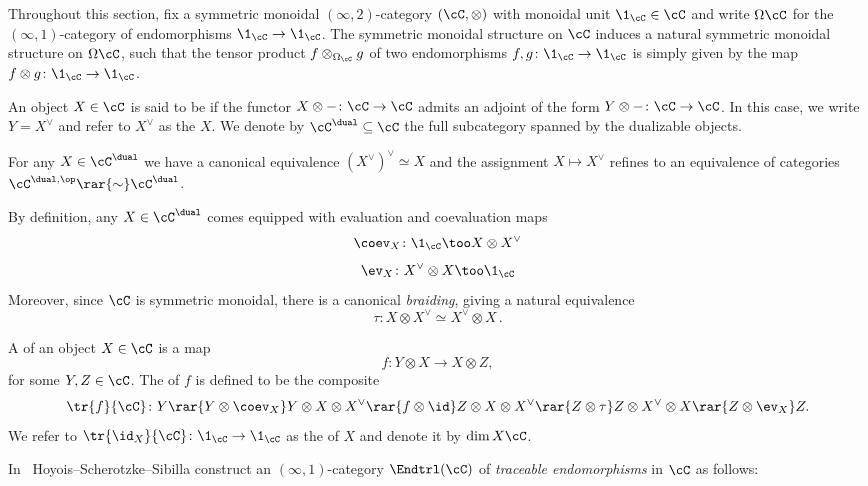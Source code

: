 Throughout this section, fix a symmetric monoidal $(\infty,2)$-category $(\cC,\otimes)$ with
monoidal unit $\1_{\cC} \in \cC$ and write $\Omega\cC$ for the $(\infty,1)$-category of
endomorphisms $\1_{\cC} \to \1_{\cC}$. The symmetric monoidal structure on $\cC$
induces a natural symmetric monoidal structure on $\Omega \cC$, such that
the tensor product $f\otimes_{\Omega_{\cC}} g$ of two endomorphisms
$f,g\colon \1_{\cC} \to \1_{\cC}$ is simply given by the map $f\otimes g\colon \1_{\cC} \to \1_{\cC}$. 

\begin{defn}
  An object $X\in \cC$ is said to be 
  if the functor $X\otimes - \colon \cC \to \cC$ admits an adjoint of the form
  $Y\otimes - \colon \cC \to \cC$. In this case, we write $Y= X^{\vee}$ and refer to $X^{\vee}$ as
  the  $X$. We denote by $\cC^{\dual}\subseteq \cC$ the full subcategory
  spanned by the dualizable objects.
\end{defn}

\begin{rmk}
  For any $X\in \cC^{\dual}$ we have a canonical equivalence $(X^{\vee})^{\vee}\simeq X$ and
  the assignment $X \mapsto X^{\vee}$ refines to an equivalence of categories
  $\cC^{\dual, \op}\rar{\sim} \cC^{\dual}$.
\end{rmk}

By definition, any $X\in \cC^{\dual}$ comes equipped with evaluation and
coevaluation maps
\[ \coev_{X}\colon \1_{\cC} \too X\otimes X^{\vee}\]
\[ \ev_{X}\colon X^{\vee} \otimes X \too \1_{\cC}\]
Moreover, since $\cC$ is symmetric monoidal, there is a canonical \textit{braiding}, giving a natural
equivalence
\[ \tau \colon X\otimes X^{\vee} \simeq X^{\vee} \otimes X \,.\]

\begin{defn}
  A  of an object $X\in \cC$ is a map
  \[ f\colon Y\otimes X  \to X \otimes Z,\]
  for some $Y,Z\in \cC$. 
  The  of $f$ is defined to be the composite
  \[ \tr{f}{\cC} \colon  Y \rar{Y \otimes \coev_X} Y\otimes X \otimes X^{\vee} \rar{f \otimes \id} Z\otimes X \otimes X^{\vee} \rar{Z\otimes \tau} Z\otimes  X^{\vee} \otimes X \rar{Z\otimes \ev_X} Z .\]
  We refer to $\tr{\id_X}{\cC}\colon \1_{\cC} \to \1_{\cC}$ as the  of
  $X$ and denote it by $\dim{X}{\cC}$.
\end{defn}

In~\cite{Hoyois_Scherotzke_Sibilla2017} Hoyois--Scherotzke--Sibilla construct an $(\infty,1)$-category $\Endtrl(\cC)$
of \textit{traceable endomorphisms} in $\cC$ as follows:

